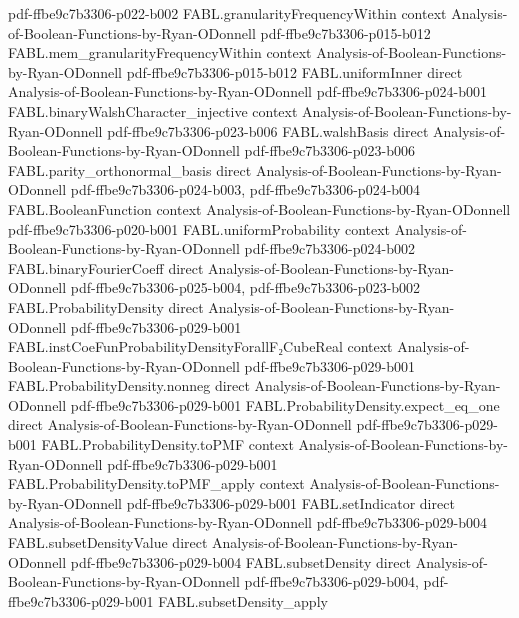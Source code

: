 \begin{theorem}
  {pdf-ffbe9c7b3306-p022-b002}
\proofstep
  {FABL.granularityFrequencyWithin}
  {context}
  {Analysis-of-Boolean-Functions-by-Ryan-ODonnell}
  {pdf-ffbe9c7b3306-p015-b012}
\proofstep
  {FABL.mem_granularityFrequencyWithin}
  {context}
  {Analysis-of-Boolean-Functions-by-Ryan-ODonnell}
  {pdf-ffbe9c7b3306-p015-b012}
\proofstep
  {FABL.uniformInner}
  {direct}
  {Analysis-of-Boolean-Functions-by-Ryan-ODonnell}
  {pdf-ffbe9c7b3306-p024-b001}
\proofstep
  {FABL.binaryWalshCharacter_injective}
  {context}
  {Analysis-of-Boolean-Functions-by-Ryan-ODonnell}
  {pdf-ffbe9c7b3306-p023-b006}
\proofstep
  {FABL.walshBasis}
  {direct}
  {Analysis-of-Boolean-Functions-by-Ryan-ODonnell}
  {pdf-ffbe9c7b3306-p023-b006}
\proofstep
  {FABL.parity_orthonormal_basis}
  {direct}
  {Analysis-of-Boolean-Functions-by-Ryan-ODonnell}
  {pdf-ffbe9c7b3306-p024-b003,
    pdf-ffbe9c7b3306-p024-b004}
\proofstep
  {FABL.BooleanFunction}
  {context}
  {Analysis-of-Boolean-Functions-by-Ryan-ODonnell}
  {pdf-ffbe9c7b3306-p020-b001}
\proofstep
  {FABL.uniformProbability}
  {context}
  {Analysis-of-Boolean-Functions-by-Ryan-ODonnell}
  {pdf-ffbe9c7b3306-p024-b002}
\proofstep
  {FABL.binaryFourierCoeff}
  {direct}
  {Analysis-of-Boolean-Functions-by-Ryan-ODonnell}
  {pdf-ffbe9c7b3306-p025-b004,
    pdf-ffbe9c7b3306-p023-b002}
\proofstep
  {FABL.ProbabilityDensity}
  {direct}
  {Analysis-of-Boolean-Functions-by-Ryan-ODonnell}
  {pdf-ffbe9c7b3306-p029-b001}
\proofstep
  {FABL.instCoeFunProbabilityDensityForallF₂CubeReal}
  {context}
  {Analysis-of-Boolean-Functions-by-Ryan-ODonnell}
  {pdf-ffbe9c7b3306-p029-b001}
\proofstep
  {FABL.ProbabilityDensity.nonneg}
  {direct}
  {Analysis-of-Boolean-Functions-by-Ryan-ODonnell}
  {pdf-ffbe9c7b3306-p029-b001}
\proofstep
  {FABL.ProbabilityDensity.expect_eq_one}
  {direct}
  {Analysis-of-Boolean-Functions-by-Ryan-ODonnell}
  {pdf-ffbe9c7b3306-p029-b001}
\proofstep
  {FABL.ProbabilityDensity.toPMF}
  {context}
  {Analysis-of-Boolean-Functions-by-Ryan-ODonnell}
  {pdf-ffbe9c7b3306-p029-b001}
\proofstep
  {FABL.ProbabilityDensity.toPMF_apply}
  {context}
  {Analysis-of-Boolean-Functions-by-Ryan-ODonnell}
  {pdf-ffbe9c7b3306-p029-b001}
\proofstep
  {FABL.setIndicator}
  {direct}
  {Analysis-of-Boolean-Functions-by-Ryan-ODonnell}
  {pdf-ffbe9c7b3306-p029-b004}
\proofstep
  {FABL.subsetDensityValue}
  {direct}
  {Analysis-of-Boolean-Functions-by-Ryan-ODonnell}
  {pdf-ffbe9c7b3306-p029-b004}
\proofstep
  {FABL.subsetDensity}
  {direct}
  {Analysis-of-Boolean-Functions-by-Ryan-ODonnell}
  {pdf-ffbe9c7b3306-p029-b004,
    pdf-ffbe9c7b3306-p029-b001}
\proofstep
  {FABL.subsetDensity_apply}

\end{theorem}
